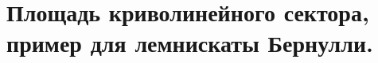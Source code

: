 \documentclass[../main.tex]{subfiles}
\begin{document}
\newpage
\hypertarget{q15}{\section{Площадь криволинейного сектора, пример для лемнискаты Бернулли.}}
\end{document}

